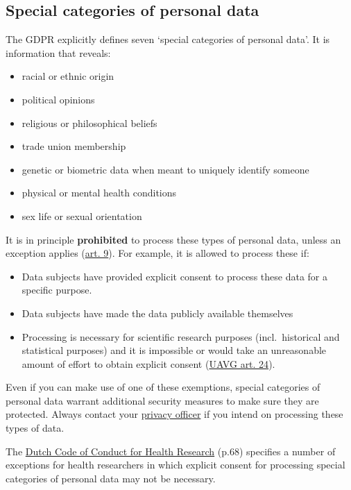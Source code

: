 \documentclass[
]{book}
\providecommand{\tightlist}{%
  \setlength{\itemsep}{0pt}\setlength{\parskip}{0pt}}
\begin{document}
\hypertarget{special-categories-of-personal-data}{%
\subsection{Special categories of personal data}\label{special-categories-of-personal-data}}

The GDPR explicitly defines seven `special categories of personal data'. It is
information that reveals:

\begin{itemize}
\tightlist
\item
  racial or ethnic origin
\item
  political opinions
\item
  religious or philosophical beliefs
\item
  trade union membership
\item
  genetic or biometric data when meant to uniquely identify someone
\item
  physical or mental health conditions
\item
  sex life or sexual orientation
\end{itemize}

It is in principle \textbf{prohibited} to process these types of personal data,
unless an exception applies
(\href{https://gdpr-info.eu/art-9-gdpr/}{art. 9}).
For example, it is allowed to process these if:

\begin{itemize}
\tightlist
\item
  Data subjects have provided explicit consent to process these data for a
  specific purpose.
\item
  Data subjects have made the data publicly available themselves
\item
  Processing is necessary for scientific research purposes (incl.~historical
  and statistical purposes) and it is impossible or would take an unreasonable
  amount of effort to obtain explicit consent
  (\href{https://wetten.overheid.nl/BWBR0040940/2021-07-01\#Hoofdstuk3}{UAVG art. 24}).
\end{itemize}

Even if you can make use of one of these exemptions, special categories of
personal data warrant additional security measures to make sure they are
protected. Always contact your \protect\hyperlink{support}{privacy officer} if you intend on
processing these types of data.

The \href{https://www.coreon.org/wp-content/uploads/2022/01/Gedragscode-Gezondheidsonderzoek-2022.pdf}{Dutch Code of Conduct for Health Research}
(p.68) specifies a number of exceptions for health researchers in which explicit
consent for processing special categories of personal data may not be necessary.
\end{document}
